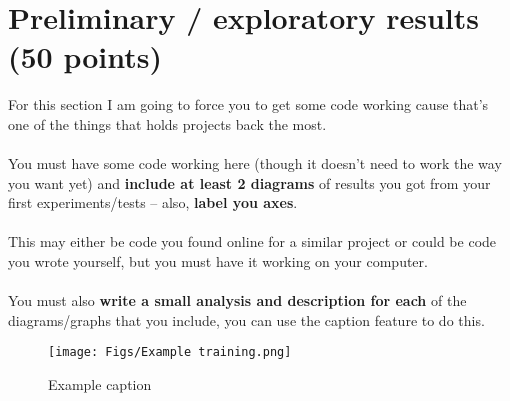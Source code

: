 \documentclass{article}
\begin{document}
\section{Preliminary / exploratory results (50 points)}

For this section I am going to force you to get some code working cause that's one of the things that holds projects back the most. \\ \\
You must have some code working here (though it doesn't need to work the way you want yet) and \textbf{include at least 2 diagrams} of results you got from your first experiments/tests -- also, \textbf{label you axes}. \\ \\
This may either be code you found online for a similar project or could be code you wrote yourself, but you must have it working on your computer. \\ \\
You must also \textbf{write a small analysis and description for each} of the diagrams/graphs that you include, you can use the caption feature to do this.

\begin{figure}[htb]
    \centering
    \texttt{[image: Figs/Example training.png]}
    \caption{ Example caption}
    \label{fig:net}
\end{figure}
\end{document}
